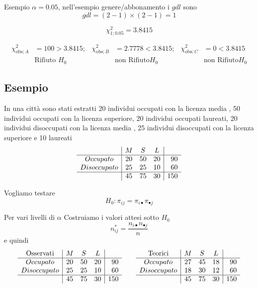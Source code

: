 \documentclass[
  11pt,
]{book}
\theoremstyle{mytheoremstyle}
\theoremstyle{mydefstyle}
\begin{document}
Esempio \(\alpha=0.05\), nell'esempio genere/abbonamento i \(gdl\) sono
\[gdl=(2-1)\times(2-1)=1\]

\[\chi_{1;0.05}^2= 3.8415\]

\[\begin{aligned}
\chi^2_{\text{obs};A}&=100> 3.8415; &\chi^2_{\text{obs};B}&=2.7778< 3.8415; &\chi^2_{\text{obs};C}&=0< 3.8415\\
&\text{Rifiuto }H_0 & & \text{non Rifiuto} H_0 & & \text{non Rifiuto}  H_0
\end{aligned}\]

\subsection{Esempio}\label{esempio-7}

In una città sono stati estratti 20 individui occupati con la licenza media , 50 individui occupati con la licenza superiore, 20 individui occupati laureati, 20 individui disoccupati con la licenza media , 25 individui disoccupati con la licenza superiore e 10 laureati
\[
\begin{array}{c|ccc|r}
         &M &S &L  & \\   \hline
Occupato    & 20     & 50     & 20     & 90\\
Disoccupato & 25     & 25     & 10     & 60\\ \hline
         & 45 & 75 & 30 & 150
\end{array}
\]

Vogliamo testare
\[H_0:\pi_{ij}=\pi_{i\bullet}\pi_{\bullet j}\]

Per vari livelli di \(\alpha\)
Costruiamo i valori attesi sotto \(H_0\)
\[n_{ij}^*=\frac{n_{i\bullet}n_{\bullet j}}{n}\]
e quindi
\[
\begin{array}{c|ccc|r}
\bf\text{Osservati}         &M &S &L  & \\   \hline
Occupato    & 20     & 50     & 20     & 90\\
Disoccupato & 25     & 25     & 10     & 60\\ \hline
         & 45 & 75 & 30 & 150
\end{array}
\qquad
\begin{array}{c|ccc|r}
\bf\text{Teorici}         &M &S &L  & \\   \hline
Occupato    & 27     & 45     & 18     & 90\\
Disoccupato & 18     & 30     & 12     & 60\\ \hline
         & 45 & 75 & 30 & 150
\end{array}\]
\end{document}
